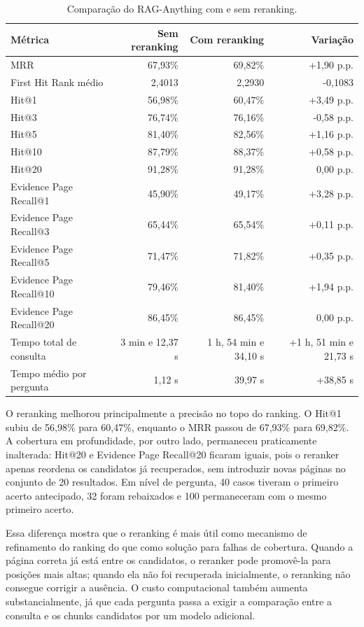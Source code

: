 \begin{table}[htbp]
\centering
\caption{Comparação do RAG-Anything com e sem reranking.}
\label{tab:raganything-reranking}
\small
\begin{tabular}{p{5.2cm}r r r}
\toprule
\textbf{Métrica} & \textbf{Sem reranking} & \textbf{Com reranking} & \textbf{Variação} \\
\midrule
MRR & 67,93\% & 69,82\% & +1,90 p.p. \\
First Hit Rank médio & 2,4013 & 2,2930 & -0,1083 \\
\addlinespace
Hit@1 & 56,98\% & 60,47\% & +3,49 p.p. \\
Hit@3 & 76,74\% & 76,16\% & -0,58 p.p. \\
Hit@5 & 81,40\% & 82,56\% & +1,16 p.p. \\
Hit@10 & 87,79\% & 88,37\% & +0,58 p.p. \\
Hit@20 & 91,28\% & 91,28\% & 0,00 p.p. \\
\addlinespace
Evidence Page Recall@1 & 45,90\% & 49,17\% & +3,28 p.p. \\
Evidence Page Recall@3 & 65,44\% & 65,54\% & +0,11 p.p. \\
Evidence Page Recall@5 & 71,47\% & 71,82\% & +0,35 p.p. \\
Evidence Page Recall@10 & 79,46\% & 81,40\% & +1,94 p.p. \\
Evidence Page Recall@20 & 86,45\% & 86,45\% & 0,00 p.p. \\
\addlinespace
Tempo total de consulta & 3 min e 12,37 s & 1 h, 54 min e 34,10 s & +1 h, 51 min e 21,73 s \\
Tempo médio por pergunta & 1,12 s & 39,97 s & +38,85 s \\
\bottomrule
\end{tabular}
\end{table}

O reranking melhorou principalmente a precisão no topo do ranking. O Hit@1 subiu de 56,98\% para 60,47\%, enquanto o MRR passou de 67,93\% para 69,82\%. A cobertura em profundidade, por outro lado, permaneceu praticamente inalterada: Hit@20 e Evidence Page Recall@20 ficaram iguais, pois o reranker apenas reordena os candidatos já recuperados, sem introduzir novas páginas no conjunto de 20 resultados. Em nível de pergunta, 40 casos tiveram o primeiro acerto antecipado, 32 foram rebaixados e 100 permaneceram com o mesmo primeiro acerto.

Essa diferença mostra que o reranking é mais útil como mecanismo de refinamento do ranking do que como solução para falhas de cobertura. Quando a página correta já está entre os candidatos, o reranker pode promovê-la para posições mais altas; quando ela não foi recuperada inicialmente, o reranking não consegue corrigir a ausência. O custo computacional também aumenta substancialmente, já que cada pergunta passa a exigir a comparação entre a consulta e os chunks candidatos por um modelo adicional.

